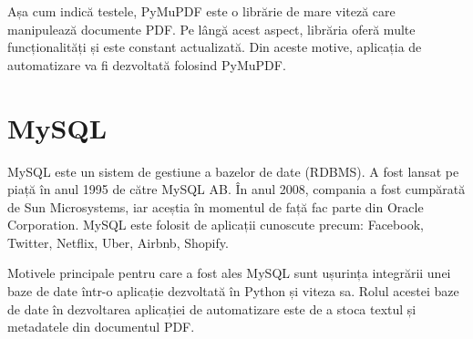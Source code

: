 Așa cum indică testele, PyMuPDF este o librărie de mare viteză care manipulează documente PDF. Pe lângă acest aspect, librăria oferă multe funcționalități și este constant actualizată. Din aceste motive, aplicația de automatizare va fi dezvoltată folosind PyMuPDF.


\section{MySQL}

MySQL \cite{dubois2013mysql} este un sistem de gestiune a bazelor de date (RDBMS). A fost lansat pe piață în anul 1995 de către MySQL AB. În anul 2008, compania a fost cumpărată de Sun Microsystems, iar aceștia în momentul de față fac parte din Oracle Corporation. MySQL este folosit de aplicații cunoscute precum: Facebook, Twitter, Netflix, Uber, Airbnb, Shopify.

Motivele principale pentru care a fost ales MySQL sunt ușurința integrării unei baze de date într-o aplicație dezvoltată în Python și viteza sa.  Rolul acestei baze de date în dezvoltarea aplicației de automatizare este de a stoca textul și metadatele din documentul PDF.




